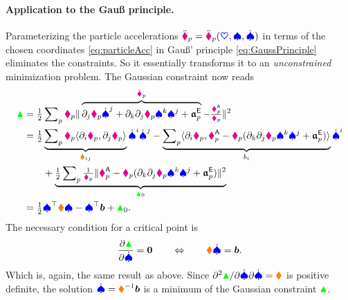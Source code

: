 \paragraph{Application to the Gauß principle.}
Parameterizing the particle accelerations $\particlePosdd{\PidxI} = \particlePosdd{\PidxI}(\sysCoord, \sysVel, \sysVeld)$ in terms of the chosen coordinates \eqref{eq:particleAcc} in Gauß' principle \eqref{eq:GaussPrinciple} eliminates the constraints.
So it essentially transforms it to an \textit{unconstrained} minimization problem.
The Gaussian constraint now reads
\begin{align}
 \GaussianConstraint &= \tfrac{1}{2} \sumParticles \particleMass{\PidxI} \norm{\overbrace{\dirDiff{\LidxII} \particlePos{\PidxI} \sysVelCoeffd{\LidxII} + \dirDiff{\LidxIII} \dirDiff{\LidxII} \particlePos{\PidxI} \sysVelCoeff{\LidxIII} \sysVelCoeff{\LidxII} + \particleAccTime{\PidxI}}^{\particlePosdd{\PidxI}} - \tfrac{\particleForceImpressed{\PidxI}}{\particleMass{\PidxI}}}^2
\nonumber\\
 &= \tfrac{1}{2} \underbrace{\sumParticles \particleMass{\PidxI} \sProd{\dirDiff{\LidxI} \particlePos{\PidxI}}{\dirDiff{\LidxII} \particlePos{\PidxI}}}_{\sysInertiaMatCoeff{\LidxI\LidxII}} \sysVelCoeffd{\LidxI}\sysVelCoeffd{\LidxII}
 - \underbrace{\sumParticles \sProd{\dirDiff{\LidxI} \particlePos{\PidxI}}{\particleForceImpressed{\PidxI} - \particleMass{\PidxI} (\dirDiff{\LidxIII} \dirDiff{\LidxII} \particlePos{\PidxI} \sysVelCoeff{\LidxIII} \sysVelCoeff{\LidxII} + \particleAccTime{\PidxI})}}_{\sysForceCoeff{\LidxI}} \sysVelCoeffd{\LidxI}
\nonumber\\
 &\qquad + \underbrace{\tfrac{1}{2} \sumParticles \tfrac{1}{\particleMass{\PidxI}}\norm{\particleForceImpressed{\PidxI} - \particleMass{\PidxI} (\dirDiff{\LidxIII} \dirDiff{\LidxII} \particlePos{\PidxI} \sysVelCoeff{\LidxIII} \sysVelCoeff{\LidxII} + \particleAccTime{\PidxI})}^2}_{\GaussianConstraint_0}
\nonumber\\
 &= \tfrac{1}{2} \sysVel^\top \sysInertiaMat \sysVel - \sysVel^\top \sysForce + \GaussianConstraint_0.
\end{align}
The necessary condition for a critical point is
\begin{align}
 \pdiff[\GaussianConstraint]{\sysVeld} = \tuple{0}
\qquad\Leftrightarrow\qquad
 \sysInertiaMat \sysVeld = \sysForce.
\end{align}
Which is, again, the same result as above.
Since $\sfrac{\partial^2 \GaussianConstraint}{\partial\sysVeld \partial \sysVeld} = \sysInertiaMat$ is positive definite, the solution $\sysVeld = \sysInertiaMat^{-1}\sysForce$ is a minimum of the Gaussian constraint $\GaussianConstraint$.

